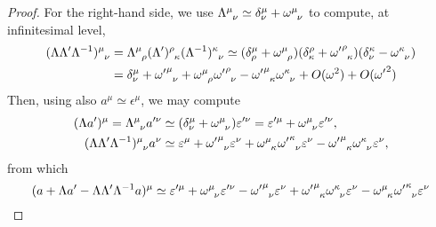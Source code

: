 \begin{proof}
    For the right-hand side, we use $\tensor{\Lambda}{^\mu_\nu} \simeq \delta^\mu_\nu + \tensor{\omega}{^\mu_\nu}$ to compute, at infinitesimal level,
    \begin{align*}
        \tensor{(\Lambda\Lambda'\Lambda^{-1})}{^\mu_\nu} &= \tensor{\Lambda}{^\mu_\rho}\tensor{(\Lambda')}{^\rho_\kappa}\tensor{(\Lambda^{-1})}{^\kappa_\nu} \simeq (\delta^\mu_\rho + \tensor{\omega}{^\mu_\rho})(\delta^\rho_\kappa + \tensor{{\omega'}}{^\rho_\kappa})(\delta^\kappa_\nu - \tensor{\omega}{^\kappa_\nu}) \\
        &= \delta^\mu_\nu + \tensor{{\omega'}}{^\mu_\nu} + \tensor{\omega}{^\mu_\rho}\tensor{{\omega'}}{^\rho_\nu} - \tensor{{\omega'}}{^\mu_\kappa}\tensor{\omega}{^\kappa_\nu} + O(\omega^2) + O({\omega'}^2)
    \end{align*}
    Then, using also $a^\mu \simeq \epsilon^\mu$, we may compute
    \begin{align*}
        (\Lambda a')^\mu = \tensor{\Lambda}{^\mu_\nu} a'^\nu &\simeq (\delta^\mu_\nu + \tensor{\omega}{^\mu_\nu}) \epsilon'^\nu = \epsilon'^\mu + \tensor{\omega}{^\mu_\nu} \epsilon'^\nu , \\
        \tensor{(\Lambda\Lambda'\Lambda^{-1})}{^\mu_\nu} a^\nu &\simeq \epsilon^\mu + \tensor{{\omega'}}{^\mu_\nu} \epsilon^\nu + \tensor{\omega}{^\mu_\kappa}\tensor{{\omega'}}{^\kappa_\nu} \epsilon^\nu - \tensor{{\omega'}}{^\mu_\kappa}\tensor{\omega}{^\kappa_\nu} \epsilon^\nu ,
    \end{align*}
    from which
    \begin{equation*}
        (a + \Lambda a' - \Lambda \Lambda' \Lambda^{-1}a)^\mu \simeq \epsilon'^\mu + \tensor{\omega}{^\mu_\nu} \epsilon'^\nu - \tensor{{\omega'}}{^\mu_\nu} \epsilon^\nu + \tensor{{\omega'}}{^\mu_\kappa}\tensor{\omega}{^\kappa_\nu} \epsilon^\nu - \tensor{\omega}{^\mu_\kappa}\tensor{{\omega'}}{^\kappa_\nu} \epsilon^\nu
    \end{equation*}


\end{proof}

